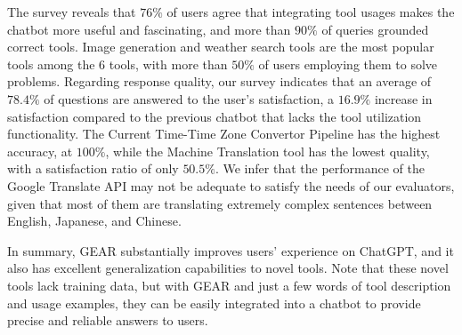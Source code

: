 \documentclass[11pt]{article}
\newcommand{\name}{{\fontfamily{cmss}\selectfont GEAR}}
\begin{document}
The survey reveals that $76\%$ of users agree that integrating tool usages makes the chatbot more useful and fascinating, and more than $90\%$ of queries grounded correct tools. Image generation and weather search tools are the most popular tools among the 6 tools, with more than $50\%$ of users employing them to solve problems. Regarding response quality, our survey indicates that an average of $78.4\%$ of questions are answered to the user's satisfaction, a $16.9\%$ increase in satisfaction compared to the previous chatbot that lacks the tool utilization functionality. The Current Time-Time Zone Convertor Pipeline has the highest accuracy, at $100\%$, while the Machine Translation tool has the lowest quality, with a satisfaction ratio of only $50.5\%$. We infer that the performance of the Google Translate API may not be adequate to satisfy the needs of our evaluators, given that most of them are translating extremely complex sentences between English, Japanese, and Chinese. 

In summary, \name{} substantially improves users' experience on ChatGPT, and it also has excellent generalization capabilities to novel tools. Note that these novel tools lack training data, but with \name{} and just a few words of tool description and usage examples, they can be easily integrated into a chatbot to provide precise and reliable answers to users.
\end{document}
